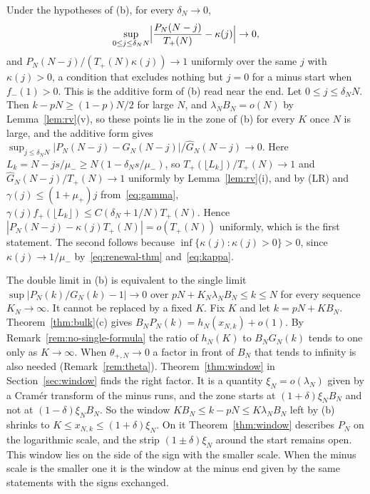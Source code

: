 \begin{remark}\label{rem:uniform-layer}
Under the hypotheses of (b), for every $\delta_N\to0$,
\[
 \sup_{0\le j\le\delta_NN}\Bigl|\frac{P_N(N-j)}{T_{+}(N)}-\kappa(j)\Bigr|\to0,
\]
and $P_N(N-j)/(T_\plus(N)\kappa(j))\to1$ uniformly over the same $j$ with $\kappa(j)>0$, a
condition that excludes nothing but $j=0$ for a minus start when $f_\minus(1)>0$. This is
the additive form of (b) read near the end. Let $0\le j\le\delta_NN$. Then
$k-pN\ge(1-p)N/2$ for large $N$, and $\lambda_NB_N=o(N)$ by Lemma~\ref{lem:rv}(v), so these
points lie in the zone of (b) for every $K$ once $N$ is large, and the additive form gives
$\sup_{j\le\delta_NN}|P_N(N-j)-G_N(N-j)|/\widehat G_N(N-j)\to0$. Here
$L_k=N-js/\mu_\minus\ge N(1-\delta_Ns/\mu_\minus)$, so $T_\plus(\lfloor L_k\rfloor)/T_\plus(N)\to1$
and $\widehat G_N(N-j)/T_\plus(N)\to1$ uniformly by Lemma~\ref{lem:rv}(i), and by (LR) and
$\gamma(j)\le(1+\mu_\plus)j$ from~\eqref{eq:gamma},
$\gamma(j)f_\plus(\lfloor L_k\rfloor)\le C(\delta_N+1/N)T_\plus(N)$. Hence
$|P_N(N-j)-\kappa(j)T_\plus(N)|=o(T_\plus(N))$ uniformly, which is the first statement. The
second follows because $\inf\{\kappa(j):\kappa(j)>0\}>0$, since $\kappa(j)\to1/\mu_\minus$
by~\eqref{eq:renewal-thm} and~\eqref{eq:kappa}.
\end{remark}

The double limit in (b) is equivalent to the single limit
$\sup|P_N(k)/G_N(k)-1|\to0$ over $pN+K_N\lambda_NB_N\le k\le N$ for every
sequence $K_N\to\infty$. It cannot be replaced by a fixed $K$. Fix $K$ and let
$k=pN+KB_N$. Theorem~\ref{thm:bulk}(c) gives $B_NP_N(k)=h_N(x_{N,k})+o(1)$. By
Remark~\ref{rem:no-single-formula} the ratio of $h_N(K)$ to $B_NG_N(k)$ tends to one
only as $K\to\infty$. When $\theta_{\plus,N}\to0$ a factor in front of $B_N$ that
tends to infinity is also needed (Remark~\ref{rem:theta}). Theorem~\ref{thm:window}
in Section~\ref{sec:window} finds the right factor. It is a quantity $\xi_N=o(\lambda_N)$
given by a Cram\'er transform of the minus runs, and the zone starts at
$(1+\delta)\xi_NB_N$ and not at $(1-\delta)\xi_NB_N$. So the window
$KB_N\le k-pN\le K\lambda_NB_N$ left by (b) shrinks to $K\le x_{N,k}\le(1+\delta)\xi_N$.
On it Theorem~\ref{thm:window} describes $P_N$ on the logarithmic scale, and the strip
$(1\pm\delta)\xi_N$ around the start remains open. This window lies on the side of
the sign with the smaller scale. When the minus scale is the smaller one it is the
window at the minus end given by the same statements with the signs exchanged.

